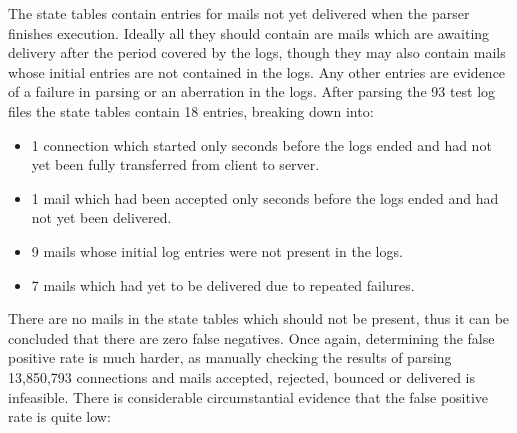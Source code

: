 \documentclass[a4paper,12pt,draft]{article}
\newcommand{\numberOFlogFILES}[0]{%
    93%
}
\begin{document}
The state tables contain entries for mails not yet delivered when the
parser finishes execution.  Ideally all they should contain are mails which
are awaiting delivery after the period covered by the logs, though they may
also contain mails whose initial entries are not contained in the logs.
Any other entries are evidence of a failure in parsing or an aberration in
the logs.  After parsing the \numberOFlogFILES{} test log files the state
tables contain 18 entries, breaking down into:

\begin{itemize}

    \item 1 connection which started only seconds before the logs ended and
        had not yet been fully transferred from client to server.

    \item 1 mail which had been accepted only seconds before the logs ended
        and had not yet been delivered.

    \item 9 mails whose initial log entries were not present in the logs.

    \item 7 mails which had yet to be delivered due to repeated failures.

\end{itemize}

There are no mails in the state tables which should not be present, thus it
can be concluded that there are zero false negatives.  Once again,
determining the false positive rate is much harder, as manually checking
the results of parsing 13,850,793 connections and mails accepted, rejected,
bounced or delivered is infeasible.  There is considerable circumstantial
evidence that the false positive rate is quite low:
\end{document}
